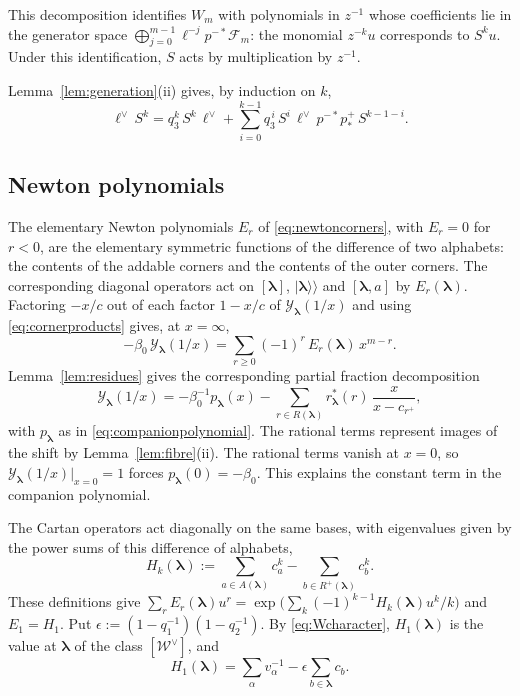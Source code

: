 \documentclass[11pt]{amsart}
\theoremstyle{definition}
\theoremstyle{remark}
\newcommand{\betaz}{\beta_0}                     %
\newcommand{\bl}{{\boldsymbol{\lambda}}}         %
\newcommand{\Add}[1]{A(#1)}                      %
\newcommand{\Rem}[1]{R(#1)}                      %
\newcommand{\CY}{\mathcal Y}
\newcommand{\Yfn}[1]{\CY_{#1}}                   %
\newcommand{\cores}[2]{r^*_{#1}(#2)}             %
\newcommand{\Cartan}[1]{H_{#1}}                  %
\newcommand{\Newton}[1]{E_{#1}}                  %
\newcommand{\ceig}[1]{c_{#1}}                    %
\newcommand{\bplus}[1]{{#1}^{+}}                 %
\newcommand{\Remp}[1]{R^{+}(#1)}                 %
\newcommand{\Fock}[1]{\mathcal F_{#1}}            %
\newcommand{\Wsp}[1]{W_{#1}}                     %
\newcommand{\Wc}{\mathcal W}                     %
\newcommand{\kket}[1]{\lvert #1\rangle\!\rangle} %
\newcommand{\fix}[1]{[#1]}                       %
\newcommand{\pt}[2]{[#1,#2]}                     %
\newcommand{\taut}{\ell}                         %
\newcommand{\dtaut}{\taut^{\vee}}                %
\newcommand{\pulm}{p^{-*}}                       %
\newcommand{\pushp}{p^+_*}                       %
\newcommand{\Shift}{S}                           %
\begin{document}
This decomposition identifies \(\Wsp{m}\) with polynomials in \(z^{-1}\) whose
coefficients lie in the generator space
\(\bigoplus_{j=0}^{m-1}\taut^{-j}\pulm\Fock{m}\): the monomial \(z^{-k}u\)
corresponds to \(\Shift^k u\). Under this identification, \(\Shift\) acts by
multiplication by \(z^{-1}\).

Lemma~\ref{lem:generation}(ii) gives, by induction on \(k\),
\begin{equation}\label{eq:iterated}
 \dtaut\,\Shift^k=q_3^k\,\Shift^k\,\dtaut
 +\sum_{i=0}^{k-1}q_3^{\,i}\,\Shift^i\,\dtaut\,\pulm\pushp\,\Shift^{k-1-i}.
\end{equation}

\subsection{Newton polynomials}\label{sec:newton}

The elementary Newton polynomials \(\Newton{r}\) of \eqref{eq:newtoncorners}, with
\(\Newton{r}=0\) for \(r<0\), are the elementary symmetric functions of the difference of
two alphabets: the contents of the addable corners and the contents of the outer corners.
The corresponding diagonal operators act on \(\fix{\bl}\), \(\kket{\bl}\) and
\(\pt{\bl}{a}\) by \(\Newton{r}(\bl)\). Factoring
\(-x/c\) out of each factor \(1-x/c\) of \(\Yfn{\bl}(1/x)\) and using \eqref{eq:cornerproducts}
gives, at \(x=\infty\),
\begin{equation}\label{eq:Yexpansion}
 -\betaz\,\Yfn{\bl}(1/x)=\sum_{r\geq0}(-1)^r\,\Newton{r}(\bl)\,x^{m-r}.
\end{equation}
Lemma~\ref{lem:residues} gives the corresponding partial fraction decomposition
\[
 \Yfn{\bl}(1/x)=-\betaz^{-1}p_\bl(x)
 -\sum_{r\in\Rem{\bl}}\cores{\bl}{r}\,
 \frac{x}{x-\ceig{\bplus{r}}},
\]
with \(p_\bl\) as in \eqref{eq:companionpolynomial}.
The rational terms represent images of the shift by Lemma~\ref{lem:fibre}(ii).
The rational terms vanish at \(x=0\), so \(\Yfn{\bl}(1/x)|_{x=0}=1\) forces
\(p_\bl(0)=-\betaz\). This explains the constant term in the companion polynomial.

The Cartan operators act diagonally on the same bases, with eigenvalues
given by the power sums of this difference of alphabets,
\[
 \Cartan{k}(\bl):=\sum_{a\in\Add{\bl}}\ceig{a}^k-\sum_{b\in\Remp{\bl}}\ceig{b}^k.
\]
These definitions give
\(\sum_r\Newton{r}(\bl)u^r=\exp\bigl(\sum_k(-1)^{k-1}\Cartan{k}(\bl)u^k/k\bigr)\) and
\(\Newton{1}=\Cartan{1}\). Put \(\epsilon:=(1-q_1^{-1})(1-q_2^{-1})\). By \eqref{eq:Wcharacter},
\(\Cartan{1}(\bl)\) is the value at \(\bl\) of the class \([\Wc^\vee]\), and
\begin{equation}\label{eq:Hone}
 \Cartan{1}(\bl)=\sum_\alpha v_\alpha^{-1}-\epsilon\sum_{b\in\bl}\ceig{b}.
\end{equation}
\end{document}
